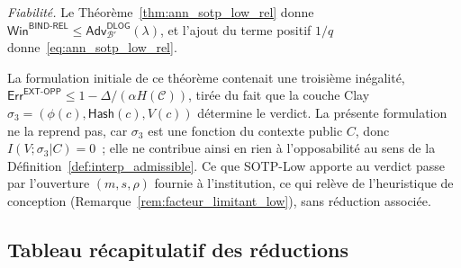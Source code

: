 \begin{sloppypar}
\begin{Preuve}
\emph{Fiabilit\'e.} Le Th\'eor\`eme~\ref{thm:ann_sotp_low_rel} donne
$\mathsf{Win}^{\mathsf{BIND\text{-}REL}} \leq \mathsf{Adv}^{\mathsf{DLOG}}_{\mathcal{B}'}(\lambda)$,
et l'ajout du terme positif $1/q$ donne~\eqref{eq:ann_sotp_low_rel}.
\end{Preuve}

\begin{remark}
\label{rem:ann_sotp_low_opp_statut}
La formulation initiale de ce th\'eor\`eme contenait une troisi\`eme in\'egalit\'e,
$\mathsf{Err}^{\mathsf{EXT\text{-}OPP}} \leq 1 - \Delta/(\alpha H(\mathcal{C}))$,
tir\'ee du fait que la couche Clay $\sigma_3 = (\phi(c), \mathsf{Hash}(c), V(c))$ d\'etermine
le verdict. La pr\'esente formulation ne la reprend pas, car $\sigma_3$ est une fonction du
contexte public $C$, donc $I(V;\sigma_3|C) = 0$~; elle ne contribue ainsi en rien \`a
l'opposabilit\'e au sens de la D\'efinition~\ref{def:interp_admissible}. Ce que
SOTP-Low apporte au verdict passe par l'ouverture $(m,s,\rho)$ fournie \`a
l'institution, ce qui rel\`eve de l'heuristique de conception
(Remarque~\ref{rem:facteur_limitant_low}), sans r\'eduction associ\'ee.
\end{remark}

\subsection{Tableau r\'ecapitulatif des r\'eductions}


\end{sloppypar}
